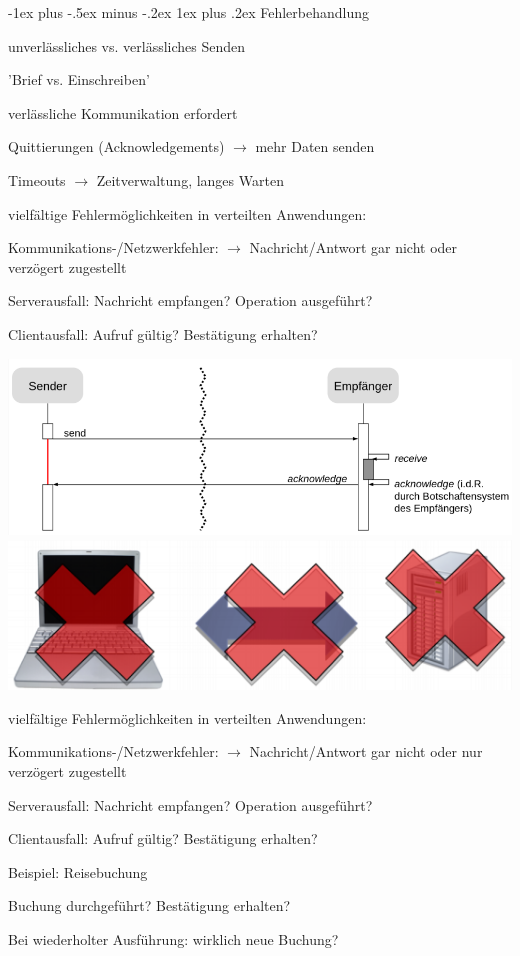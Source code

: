 \documentclass[10pt]{article}
\makeatletter
\renewcommand{\subsubsection}{\@startsection{subsubsection}{3}{0mm}%
                                {-1ex plus -.5ex minus -.2ex}%
                                {1ex plus .2ex}%
                                {\normalfont\small\bfseries}}
\makeatother
\begin{document}
\subsubsection{Fehlerbehandlung}
\begin{itemize*}
  \item unverlässliches vs. verlässliches Senden
  \begin{itemize*}
    \item 'Brief vs. Einschreiben'
  \end{itemize*}
  \item verlässliche Kommunikation erfordert
  \begin{itemize*}
    \item Quittierungen (Acknowledgements) $\rightarrow$ mehr Daten senden
    \item Timeouts $\rightarrow$ Zeitverwaltung, langes Warten
  \end{itemize*}
  \item vielfältige Fehlermöglichkeiten in verteilten Anwendungen:
  \begin{itemize*}
    \item Kommunikations-/Netzwerkfehler: $\rightarrow$ Nachricht/Antwort gar nicht oder verzögert zugestellt
    \item Serverausfall: Nachricht empfangen? Operation ausgeführt?
    \item Clientausfall: Aufruf gültig? Bestätigung erhalten?
  \end{itemize*}
\end{itemize*}
\begin{center}
  \includegraphics[width=0.4\linewidth]{Assets/Programmierparadigmen-kommunikation-fehler}
  \includegraphics[width=0.4\linewidth]{Assets/Programmierparadigmen-kommunikation-fehler-2}
\end{center}

vielfältige Fehlermöglichkeiten in verteilten Anwendungen: 
\begin{itemize*}
  \item Kommunikations-/Netzwerkfehler: $\rightarrow$ Nachricht/Antwort gar nicht oder nur verzögert zugestellt
  \item Serverausfall: Nachricht empfangen? Operation ausgeführt?
  \item Clientausfall: Aufruf gültig? Bestätigung erhalten?
  \item Beispiel: Reisebuchung
  \begin{itemize*}
    \item Buchung durchgeführt? Bestätigung erhalten?
    \item Bei wiederholter Ausführung: wirklich neue Buchung?
  \end{itemize*}
\end{itemize*}
\end{document}
